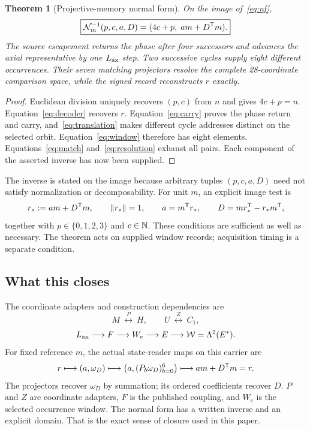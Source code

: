 \documentclass[11pt]{article}
\newtheorem{theorem}{Theorem}[section]
\theoremstyle{definition}\newtheorem{definition}[theorem]{Definition}
\begin{document}
\begin{theorem}[Projective-memory normal form]
On the image of~\eqref{eq:nf},
\begin{equation}
 \boxed{\mathcal N_m^{-1}(p,c,a,D)=(4c+p,\;am+D^\mathsf T m).}
 \label{eq:nfinverse}
\end{equation}
The source escapement returns the phase after four successors and advances the axial representative by one $L_{\mathrm{ax}}$ step. Two successive cycles supply eight different occurrences. Their seven matching projectors resolve the complete 28-coordinate comparison space, while the signed record reconstructs $r$ exactly.
\end{theorem}
\begin{proof}
Euclidean division uniquely recovers $(p,c)$ from $n$ and gives $4c+p=n$. Equation~\eqref{eq:decoder} recovers $r$. Equation~\eqref{eq:carry} proves the phase return and carry, and~\eqref{eq:translation} makes different cycle addresses distinct on the selected orbit. Equation~\eqref{eq:window} therefore has eight elements. Equations~\eqref{eq:match} and~\eqref{eq:resolution} exhaust all pairs. Each component of the asserted inverse has now been supplied.
\end{proof}

The inverse is stated on the image because arbitrary tuples $(p,c,a,D)$ need not satisfy normalization or decomposability. For unit $m$, an explicit image test is
\[
 r_*:=am+D^\mathsf T m,\qquad \|r_*\|=1,\qquad
 a=m^\mathsf T r_*,\qquad D=mr_*^\mathsf T-r_*m^\mathsf T,
\]
together with $p\in\{0,1,2,3\}$ and $c\in\mathbb N$. These conditions are sufficient as well as necessary. The theorem acts on supplied window records; acquisition timing is a separate condition.

\subsection{What this closes}
The coordinate adapters and construction dependencies are
\[
 M\ \overset{P}{\longleftrightarrow}\ H,\qquad
 U\ \overset{Z}{\longleftrightarrow}\ C_1,
\]
\[
 L_{\mathrm{ax}}\longrightarrow F\longrightarrow W_c\longrightarrow E
 \longrightarrow\mathcal W=\Lambda^2(E^*).
\]
For fixed reference $m$, the actual state-reader maps on this carrier are
\[
 r\longmapsto(a,\omega_D)\longmapsto\bigl(a,(P_b\omega_D)_{b=0}^{6}\bigr)
 \longmapsto am+D^{\mathsf T}m=r.
\]
The projectors recover $\omega_D$ by summation; its ordered coefficients recover $D$. $P$ and $Z$ are coordinate adapters, $F$ is the published coupling, and $W_c$ is the selected occurrence window. The normal form has a written inverse and an explicit domain. That is the exact sense of closure used in this paper.
\end{document}
